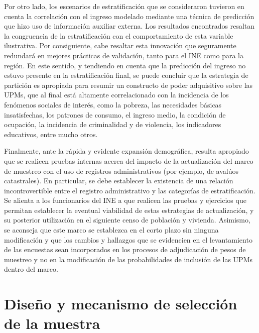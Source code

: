 \documentclass[
  12pt,
  spanish,
]{book}
\begin{document}
Por otro lado, los escenarios de estratificación que se consideraron tuvieron en cuenta la correlación con el ingreso modelado mediante una técnica de predicción que hizo uso de información auxiliar externa. Los resultados encontrados resaltan la congruencia de la estratificación con el comportamiento de esta variable ilustrativa. Por consiguiente, cabe resaltar esta innovación que seguramente redundará en mejores prácticas de validación, tanto para el INE como para la región. En este sentido, y tendiendo en cuenta que la predicción del ingreso no estuvo presente en la estratificación final, se puede concluir que la estrategia de partición es apropiada para resumir un constructo de poder adquisitivo sobre las UPMs, que al final está altamente correlacionado con la incidencia de los fenómenos sociales de interés, como la pobreza, las necesidades básicas insatisfechas, los patrones de consumo, el ingreso medio, la condición de ocupación, la incidencia de criminalidad y de violencia, los indicadores educativos, entre mucho otros.

Finalmente, ante la rápida y evidente expansión demográfica, resulta apropiado que se realicen pruebas internas acerca del impacto de la actualización del marco de muestreo con el uso de registros administrativos (por ejemplo, de avalúos catastrales). En particular, se debe establecer la existencia de una relación incontrovertible entre el registro administrativo y las categorías de estratificación. Se alienta a los funcionarios del INE a que realicen las pruebas y ejercicios que permitan establecer la eventual viabilidad de estas estrategias de actualización, y su posterior utilización en el siguiente censo de población y vivienda. Asimismo, se aconseja que este marco se establezca en el corto plazo sin ninguna modificación y que los cambios y hallazgos que se evidencien en el levantamiento de las encuestas sean incorporados en los procesos de adjudicación de pesos de muestreo y no en la modificación de las probabilidades de inclusión de las UPMs dentro del marco.

\hypertarget{diseuxf1o-y-mecanismo-de-selecciuxf3n-de-la-muestra}{%
\chapter{Diseño y mecanismo de selección de la muestra}\label{diseuxf1o-y-mecanismo-de-selecciuxf3n-de-la-muestra}}
\end{document}
